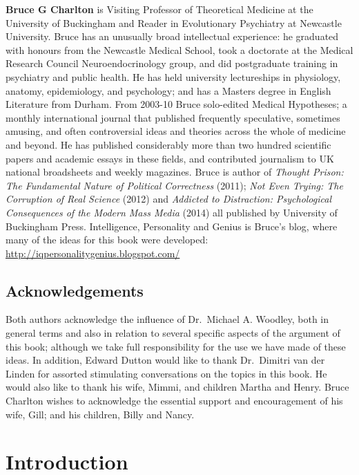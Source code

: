 \documentclass[
]{book}
\begin{document}
\textbf{Bruce G Charlton} is Visiting Professor of Theoretical Medicine at the University of Buckingham and Reader in Evolutionary Psychiatry at Newcastle University. Bruce has an unusually broad intellectual experience: he graduated with honours from the Newcastle Medical School, took a doctorate at the Medical Research Council Neuroendocrinology group, and did postgraduate training in psychiatry and public health. He has held university lectureships in physiology, anatomy, epidemiology, and psychology; and has a Masters degree in English Literature from Durham. From 2003-10 Bruce solo-edited Medical Hypotheses; a monthly international journal that published frequently speculative, sometimes amusing, and often controversial ideas and theories across the whole of medicine and beyond. He has published considerably more than two hundred scientific papers and academic essays in these fields, and contributed journalism to UK national broadsheets and weekly magazines. Bruce is author of \emph{Thought Prison: The Fundamental Nature of Political Correctness} (2011); \emph{Not Even Trying: The Corruption of Real Science} (2012) and \emph{Addicted to Distraction: Psychological Consequences of the Modern Mass Media} (2014) all published by University of Buckingham Press. Intelligence, Personality and Genius is Bruce's blog, where many of the ideas for this book were developed: \url{http://iqpersonalitygenius.blogspot.com/}

\hypertarget{acknowledgements}{%
\section*{Acknowledgements}\label{acknowledgements}}

Both authors acknowledge the influence of Dr.~Michael A. Woodley, both in general terms and also in relation to several specific aspects of the argument of this book; although we take full responsibility for the use we have made of these ideas. In addition, Edward Dutton would like to thank Dr.~Dimitri van der Linden for assorted stimulating conversations on the topics in this book. He would also like to thank his wife, Mimmi, and children Martha and Henry. Bruce Charlton wishes to acknowledge the essential support and encouragement of his wife, Gill; and his children, Billy and Nancy.

\hypertarget{introduction}{%
\chapter*{Introduction}\label{introduction}}
\end{document}
